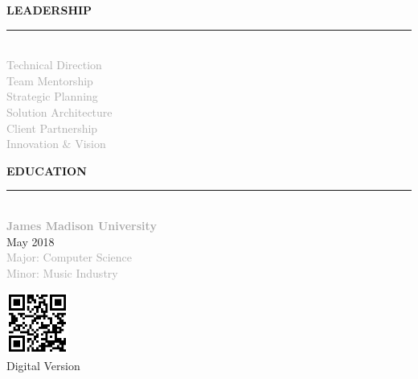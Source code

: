 \documentclass[10pt,letterpaper]{article}
\newcommand{\sidebarheader}[1]{%
    \vspace{6pt}
    {\headingfont\small\textcolor{accent}{\MakeUppercase{\textbf{#1}}}}
    \vspace{1pt}
    \par\noindent\textcolor{accent}{\rule{\linewidth}{1.5pt}}
    \vspace{2pt}
}
\begin{document}
{\begin{minipage}[t][10.885in][t]{2.7in}
\begin{minipage}{2.1in}
\sidebarheader{Leadership}
{\scriptsize\textcolor{darkgray}{\\[-6pt]
Technical Direction\\[3pt]
Team Mentorship\\[3pt]
Strategic Planning\\[3pt]
Solution Architecture\\[3pt]
Client Partnership\\[3pt]
Innovation \& Vision\\[3pt]
}}

\sidebarheader{Education}
{\footnotesize\\[-6pt]
\textbf{\textcolor{darkgray}{James Madison University}}\\[3pt]
\textcolor{mediumgray}{May 2018}\\[3pt]
\textcolor{darkgray}{Major: Computer Science\\[3pt]
Minor: Music Industry\\[3pt]}
}

\vspace{10pt}

\begin{center}
\includegraphics[width=0.8in]{qr_code.png}\\[3pt]
{\tiny\textcolor{mediumgray}{Digital Version}}
\end{center}

\vfill

\end{minipage}
\end{minipage}%
}%
\hspace{0pt}%
\end{document}
